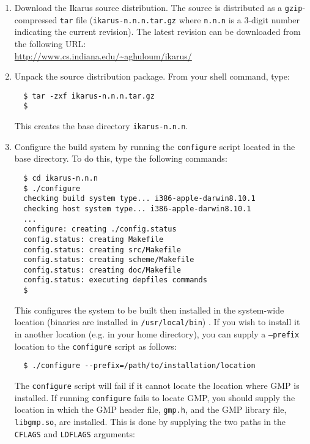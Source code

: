 \documentclass[onecolumn, 12pt, twoside, openright, dvipdfm]{book}
\begin{document}
\begin{enumerate}

\item Download the Ikarus source distribution.  The source is
distributed as a \texttt{gzip}-compressed \texttt{tar} file
(\texttt{ikarus-n.n.n.tar.gz} where \texttt{n.n.n} is a 3-digit
number indicating the current revision).  The latest revision can be
downloaded from the following URL:\\
\url{http://www.cs.indiana.edu/~aghuloum/ikarus/}

\item Unpack the source distribution package.  From your shell
command, type:
\begin{verbatim}
  $ tar -zxf ikarus-n.n.n.tar.gz
  $
\end{verbatim}
This creates the base directory \texttt{ikarus-n.n.n}.

\item Configure the build system by running the \texttt{configure}
script located in the base directory.  To do this, type the
following commands:
\begin{verbatim}
  $ cd ikarus-n.n.n
  $ ./configure
  checking build system type... i386-apple-darwin8.10.1
  checking host system type... i386-apple-darwin8.10.1
  ...
  configure: creating ./config.status
  config.status: creating Makefile
  config.status: creating src/Makefile
  config.status: creating scheme/Makefile
  config.status: creating doc/Makefile
  config.status: executing depfiles commands
  $
\end{verbatim}

This configures the system to be built then installed in the
system-wide location (binaries are installed in
\texttt{/usr/local/bin}) .  If you wish to install it
in another location (e.g. in your home directory), you can supply
a \texttt{--prefix} location to the \texttt{configure} script as
follows:

\begin{verbatim}
  $ ./configure --prefix=/path/to/installation/location
\end{verbatim}

The \texttt{configure} script will fail if it cannot locate the
location where GMP is installed.  If running \texttt{configure}
fails to locate GMP, you should supply the location in which the GMP
header file, \texttt{gmp.h}, and the GMP library file,
\texttt{libgmp.so}, are installed.  This is done by supplying the
two paths in the \texttt{CFLAGS} and \texttt{LDFLAGS} arguments:


\end{enumerate}
\end{document}
